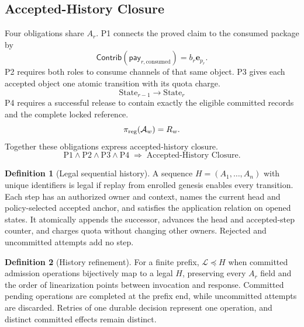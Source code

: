 \documentclass[conference,compsoc]{IEEEtran}
\theoremstyle{definition}
\newtheorem{definition}{Definition}[section]
\newtheorem{definition}{Definition}
\numberwithin{equation}{section}
\numberwithin{table}{section}
\numberwithin{figure}{section}
\theoremstyle{plain}
\begin{document}
\subsection{Accepted-History Closure}
\label{sec:boundaries}
\label{sec:prelim-goals}
\label{sec:composition-summary}

Four obligations share \(A_r\). P1 connects the proved claim to the consumed
package by
\begin{equation}
\mathsf{Contrib}(\mathsf{pay}_{r,\mathrm{consumed}})
  =b_r\mathbf e_{p_r}.
  \label{eq:p1}
\end{equation}
P2 requires both roles to consume channels of that same object. P3 gives each
accepted object one atomic transition with its quota charge.
\begin{equation}
  \mathrm{State}_{r-1}\rightarrow\mathrm{State}_{r}
  \label{eq:p3}
\end{equation}
P4 requires a successful release to contain exactly the eligible committed
records and the complete locked reference.
\begin{equation}
  \pi_{\rm reg}(\mathcal A_w)=R_w .
  \label{eq:p4}
\end{equation}
Together these obligations express accepted-history closure.
\begin{equation}
  \mathrm{P1}\land\mathrm{P2}\land\mathrm{P3}\land\mathrm{P4}
  \;\Rightarrow\;\text{Accepted-History Closure}.
  \label{eq:closure}
\end{equation}

\begin{definition}[Legal sequential history]
\label{def:legal-history}
A sequence \(H=(A_1,\ldots,A_n)\) with unique identifiers is legal if replay
from enrolled genesis enables every transition. Each step has an authorized
owner and context, names the current head and policy-selected accepted anchor,
and satisfies the application relation on opened states. It atomically appends
the successor, advances the head and accepted-step counter, and charges quota
without changing other owners. Rejected and uncommitted attempts add no step.
\end{definition}

\begin{definition}[History refinement]
\label{def:history-refinement}
For a finite prefix, \(\mathcal L\preceq H\) when committed admission
operations bijectively map to a legal \(H\), preserving every \(A_r\) field
and the order of linearization points between invocation and response.
Committed pending operations are completed at the prefix end, while
uncommitted attempts are discarded. Retries of one durable decision represent
one operation, and distinct committed effects remain distinct.
\end{definition}
\end{document}
